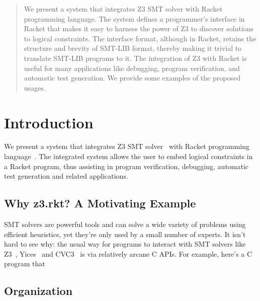 \begin{abstract}
 We present a system that integrates Z3 SMT solver with
 Racket programming language. The system defines a programmer's
 interface in Racket that makes it easy to harness the power
 of Z3 to discover solutions to logical constraints. The
 interface format, although in Racket, retains the structure
 and brevity of SMT-LIB format, thereby making it trivial to
 translate SMT-LIB programs to it. The integration of Z3
 with Racket is useful for many applications like debugging,
 program verification, and automatic test generation. We
 provide some examples of the proposed usages.
\end{abstract}
\section{Introduction}
We present a system that integrates Z3 SMT solver~\cite{z3} with
Racket programming language~\cite{racket}. The integrated
system allows the user to embed logical constraints in a
Racket program, thus assisting in program verification,
debugging, automatic test generation and related
applications.

\subsection{Why z3.rkt? A Motivating Example}

SMT solvers are powerful tools and can solve a wide variety of problems using
efficient heuristics, yet they're only used by a small number of experts. It
isn't hard to see why: the usual way for programs to interact with SMT solvers
like Z3~\cite{z3}, Yices~\cite{yices} and CVC3~\cite{cvc3} is via relatively
arcane C APIs. For example, here's a C program that 

\subsection{Organization}
